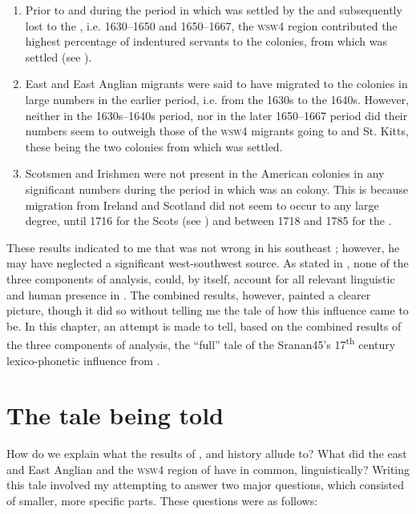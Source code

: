 \begin{enumerate}
\item{Prior to and during the period in which  was settled by the  and subsequently lost to the , i.e. 1630--1650 and 1650--1667, the \textsc{wsw4} region contributed the highest percentage of indentured servants to the  colonies, from which  was settled (see ).}
\item{East and East Anglian  migrants were said to have migrated to the  colonies in large numbers in the earlier period, i.e. from the 1630s to the 1640s. However, neither in the 1630s--1640s period, nor in the later 1650--1667 period did their numbers seem to outweigh those of the \textsc{wsw4} migrants going to  and St. Kitts, these being the two colonies from which  was settled.}
\item{Scotsmen and Irishmen were not present in the  American colonies in any significant numbers during the period in which  was an  colony. This is because migration from Ireland and Scotland did not seem to occur to any large degree, until 1716 for the Scots (see \citealt{Dobson05}) and between 1718 and 1785 for the  \citep{Griffin01}.}
\end{enumerate}

These results indicated to me that \citet{Smith87, Smith08} was not wrong in his southeast ; however, he may have neglected a significant west-southwest  source. As stated in , none of the three components of analysis, could, by itself, account for all relevant  linguistic and human presence in . The combined results, however, painted a clearer picture, though it did so without telling me the tale of how this influence came to be. In this chapter, an attempt is made to tell, based on the combined results of the three components of analysis, the ``full'' tale of the Sranan45's 17\textsuperscript{th} century lexico-phonetic influence from .

\section{The tale being told}\label{7.2}
How do we explain what the results of ,  and history allude to? What did the east and East Anglian  and the \textsc{wsw4} region of  have in common, linguistically? Writing this tale involved my attempting to answer two major questions, which consisted of smaller, more specific parts. These questions were as follows:

